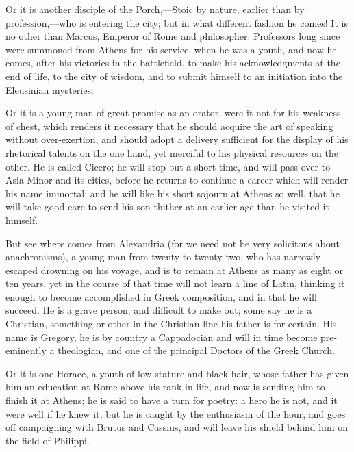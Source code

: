Or it is another disciple of the Porch,—Stoic by nature, earlier
than by profession,—who is entering the city; but in what different
fashion he comes! It is no other than Marcus, Emperor of Rome and
philosopher. Professors long since were summoned from Athens for his
service, when he was a youth, and now he comes, after his victories in
the battlefield, to make his acknowledgments at the end of life, to
the city of wisdom, and to submit himself to an initiation into
the Eleusinian mysteries.

Or it is a young man of great promise as an orator, were it not for
his weakness of chest, which renders it necessary that he should
acquire the art of speaking without over-exertion, and should adopt a
delivery sufficient for the display of his rhetorical talents on the
one hand, yet merciful to his physical resources on the other. He is
called Cicero; he will stop but a short time, and will pass over to
Asia Minor and its cities, before he returns to continue a career
which will render his name immortal; and he will like his short
sojourn at Athens so well, that he will take good care to send his son
thither at an earlier age than he visited it himself.

But see where comes from Alexandria (for we need not be very
solicitous about anachronisms), a young man from twenty to twenty-two,
who has narrowly escaped drowning on his voyage, and is to remain at
Athens as many as eight or ten years, yet in the course of that time
will not learn a line of Latin, thinking it enough to become
accomplished in Greek composition, and in that he will succeed. He is
a grave person, and difficult to make out; some say he is a Christian,
something or other in the Christian line his father is for certain.
His name is Gregory, he is by country a Cappadocian and will in time
become pre-eminently a theologian, and one of the principal Doctors of
the Greek Church.

Or it is one Horace, a youth of low stature and black hair, whose
father has given him an education at Rome above his rank in life, and
now is sending him to finish it at Athens; he is said to have a turn
for poetry: a hero he is not, and it were well if he knew it; but he
is caught by the enthusiasm of the hour, and goes off campaigning
with Brutus and Cassius, and will leave his shield behind him on the
field of Philippi.

